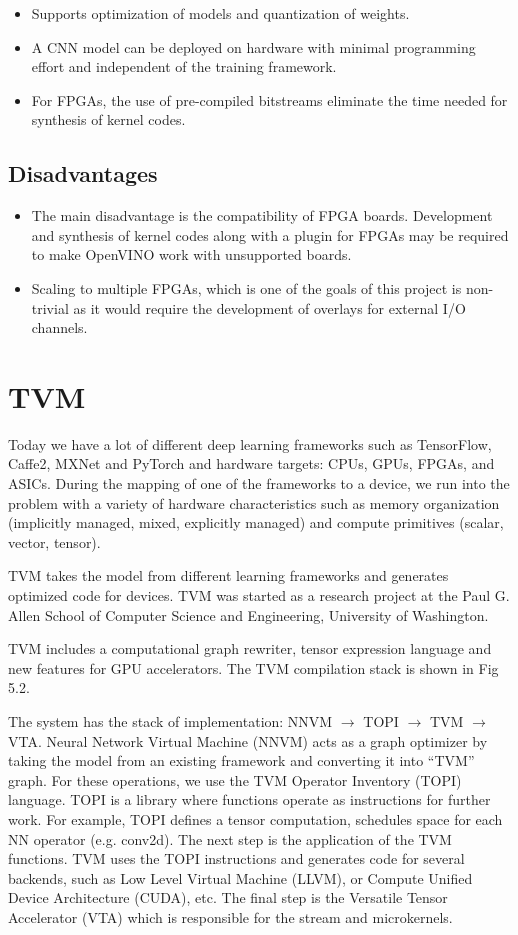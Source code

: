 \documentclass[titlepage]{report}
\begin{document}
 \begin{itemize}
 \item Supports optimization of models and quantization of weights.
 \item A CNN model can be deployed on hardware with minimal programming effort and independent of the training framework.
 \item For FPGAs, the use of pre-compiled bitstreams eliminate the time needed for synthesis of kernel codes.
 \end{itemize}
 
 \subsection{Disadvantages}
 \begin{itemize}
 \item The main disadvantage is the compatibility of FPGA boards. Development and synthesis of kernel codes along with a plugin for FPGAs may be required to make OpenVINO work with unsupported boards. 
 \item Scaling to multiple FPGAs, which is one of the goals of this project is non-trivial as it would require the development of overlays for external I/O channels. 
 \end{itemize}
\section{TVM}

Today we have a lot of different deep learning frameworks such as TensorFlow, Caffe2, MXNet and PyTorch and hardware targets: CPUs, GPUs, FPGAs, and ASICs. During the mapping of one of the frameworks to a device, we run into the problem with a variety of hardware characteristics such as memory organization (implicitly managed, mixed, explicitly managed) and compute primitives (scalar, vector, tensor).

TVM takes the model from different learning frameworks and generates optimized code for devices. TVM was started as a research project at the Paul G. Allen School of Computer Science and Engineering, University of Washington.

TVM includes a computational graph rewriter, tensor expression language and new features for GPU accelerators. The TVM compilation stack is shown in Fig 5.2.

The system has the stack of implementation: NNVM $\to$ TOPI $\to$ TVM $\to$ VTA. Neural Network Virtual Machine (NNVM) acts as a graph optimizer by taking the model from an existing framework and converting it into “TVM” graph. For these operations, we use the TVM Operator Inventory (TOPI) language. TOPI is a library where functions operate as instructions for further work. For example, TOPI defines a tensor computation, schedules space for each NN operator (e.g. conv2d). The next step is the application of the TVM functions. TVM uses the TOPI instructions and generates code for several backends, such as Low Level Virtual Machine (LLVM), or Compute Unified Device Architecture (CUDA), etc. The final step is the Versatile Tensor Accelerator (VTA) which is responsible for the stream and microkernels. 
\end{document}
